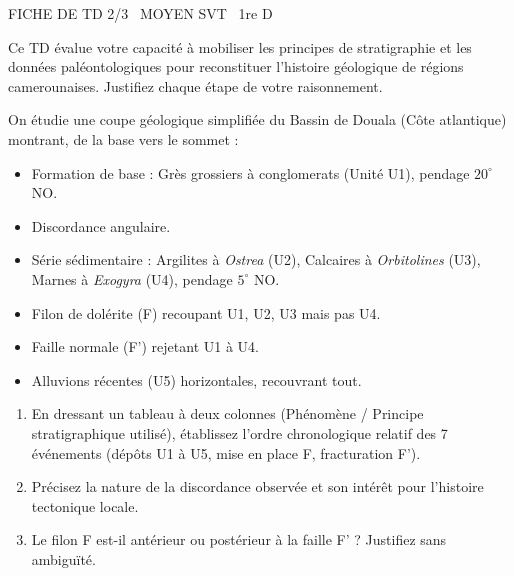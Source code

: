 \documentclass[11pt]{article}
\begin{document}
\begin{tcolorbox}[enhanced,colback=popink,colframe=popink,arc=10pt,boxrule=0pt,left=12pt,right=12pt,top=9pt,bottom=9pt]
{\color{white}\popxbold\small FICHE DE TD 2/3 \textbullet\ MOYEN \hfill SVT \textbullet\ 1re D\par}
\end{tcolorbox}
\vspace{4pt}
Ce TD évalue votre capacité à mobiliser les principes de stratigraphie et les données paléontologiques pour reconstituer l'histoire géologique de régions camerounaises. Justifiez chaque étape de votre raisonnement.

\begin{exercice}
On étudie une coupe géologique simplifiée du Bassin de Douala (Côte atlantique) montrant, de la base vers le sommet : 
\begin{itemize}
    \item Formation de base : Grès grossiers à conglomerats (Unité U1), pendage $20^\circ$ NO.
    \item Discordance angulaire.
    \item Série sédimentaire : Argilites à \textit{Ostrea} (U2), Calcaires à \textit{Orbitolines} (U3), Marnes à \textit{Exogyra} (U4), pendage $5^\circ$ NO.
    \item Filon de dolérite (F) recoupant U1, U2, U3 mais pas U4.
    \item Faille normale (F') rejetant U1 à U4.
    \item Alluvions récentes (U5) horizontales, recouvrant tout.
\end{itemize}
\begin{enumerate}
    \item En dressant un tableau à deux colonnes (Phénomène / Principe stratigraphique utilisé), établissez l'ordre chronologique relatif des 7 événements (dépôts U1 à U5, mise en place F, fracturation F'). 
    \item Précisez la nature de la discordance observée et son intérêt pour l'histoire tectonique locale.
    \item Le filon F est-il antérieur ou postérieur à la faille F' ? Justifiez sans ambiguïté.
\end{enumerate}
\end{exercice}
\end{document}
